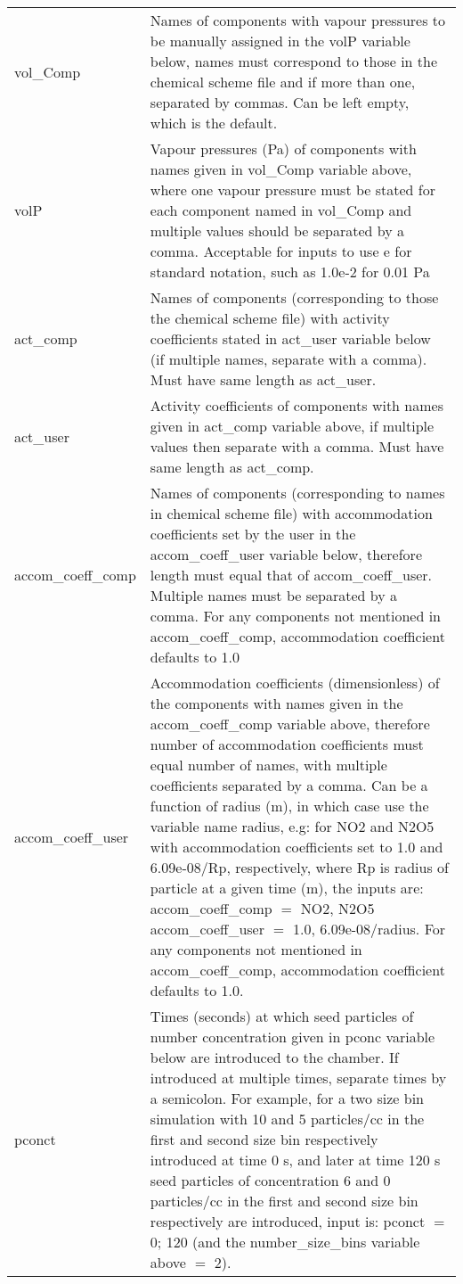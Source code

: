 \documentclass[gmd, manuscript]{copernicus}
\begin{document}
\begin{center}
\begin{supertabular}{p{0.15\textwidth}p{0.75\textwidth}}
vol\_Comp & Names of components with vapour pressures to be manually assigned in the volP variable below, names must correspond to those in the chemical scheme file and if more than one, separated by commas.  Can be left empty, which is the default.\\

volP & Vapour pressures (Pa) of components with names given in vol\_Comp variable above, where one vapour pressure must be stated for each component named in vol\_Comp and multiple values should be separated by a comma.  Acceptable for inputs to use e for standard notation, such as 1.0e-2 for 0.01 Pa\\

act\_comp & Names of components (corresponding to those the chemical scheme file) with activity coefficients stated in act\_user variable below (if multiple names, separate with a comma).  Must have same length as act\_user.\\

act\_user & Activity coefficients of components with names given in act\_comp variable above, if multiple values then separate with a comma.  Must have same length as act\_comp.\\

accom\_coeff\_comp & Names of components (corresponding to names in chemical scheme file) with accommodation coefficients set by the user in the accom\_coeff\_user variable below, therefore length must equal that of accom\_coeff\_user.  Multiple names must be separated by a comma.  For any components not mentioned in accom\_coeff\_comp, accommodation coefficient defaults to 1.0\\

accom\_coeff\_user & Accommodation coefficients (dimensionless) of the components with names given in the accom\_coeff\_comp variable above, therefore number of accommodation coefficients must equal number of names, with multiple coefficients separated by a comma.  Can be a function of radius (m), in which case use the variable name radius, e.g: for NO2 and N2O5 with accommodation coefficients set to 1.0 and 6.09e-08/Rp, respectively, where Rp is radius of particle at a given time (m), the inputs are: accom\_coeff\_comp $=$ NO2, N2O5 accom\_coeff\_user $=$ 1.0, 6.09e-08/radius.  For any components not mentioned in accom\_coeff\_comp, accommodation coefficient defaults to 1.0.  \\

pconct & Times (seconds) at which seed particles of number concentration given in pconc variable below are introduced to the chamber.  If introduced at multiple times, separate times by a semicolon.  For example, for a two size bin simulation with 10 and 5 particles/cc in the first and second size bin respectively introduced at time 0 s, and later at time 120 s seed particles of concentration 6 and 0 particles/cc in the first and second size bin respectively are introduced, input is: pconct $=$ 0; 120 (and the number\_size\_bins variable above $=$ 2). \\


\end{supertabular}
\end{center}
\end{document}
